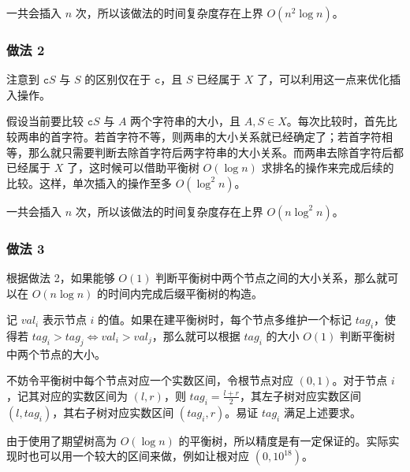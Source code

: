 \documentclass[]{article}
\begin{document}
一共会插入 \(n\) 次，所以该做法的时间复杂度存在上界 \(O(n^2 \log n)\)。

\hypertarget{ux505aux6cd5-2}{%
\subsubsection{做法 2}\label{ux505aux6cd5-2}}

注意到 \(\texttt{c}S\) 与 \(S\) 的区别仅在于 \(\texttt{c}\)，且 \(S\)
已经属于 \(X\) 了，可以利用这一点来优化插入操作。

假设当前要比较 \(\texttt{c}S\) 与 \(A\) 两个字符串的大小，且
\(A, S \in X\)。每次比较时，首先比较两串的首字符。若首字符不等，则两串的大小关系就已经确定了；若首字符相等，那么就只需要判断去除首字符后两字符串的大小关系。而两串去除首字符后都已经属于
\(X\) 了，这时候可以借助平衡树 \(O(\log n)\)
求排名的操作来完成后续的比较。这样，单次插入的操作至多 \(O(\log^2 n)\)。

一共会插入 \(n\) 次，所以该做法的时间复杂度存在上界 \(O(n \log^2 n)\)。

\hypertarget{ux505aux6cd5-3}{%
\subsubsection{做法 3}\label{ux505aux6cd5-3}}

根据做法 2，如果能够 \(O(1)\)
判断平衡树中两个节点之间的大小关系，那么就可以在 \(O(n \log n)\)
的时间内完成后缀平衡树的构造。

记 \(val_i\) 表示节点 \(i\)
的值。如果在建平衡树时，每个节点多维护一个标记 \(tag_i\)，使得若
\(tag_i > tag_j \iff val_i > val_j\)，那么就可以根据 \(tag_i\) 的大小
\(O(1)\) 判断平衡树中两个节点的大小。

不妨令平衡树中每个节点对应一个实数区间，令根节点对应
\((0, 1)\)。对于节点 \(i\)，记其对应的实数区间为 \((l, r)\)，则
\(tag_i = \frac{l + r}{2}\)，其左子树对应实数区间
\((l, tag_i)\)，其右子树对应实数区间 \((tag_i, r)\)。易证 \(tag_i\)
满足上述要求。

由于使用了期望树高为 \(O(\log n)\)
的平衡树，所以精度是有一定保证的。实际实现时也可以用一个较大的区间来做，例如让根对应
\((0, 10^{18})\)。
\end{document}

